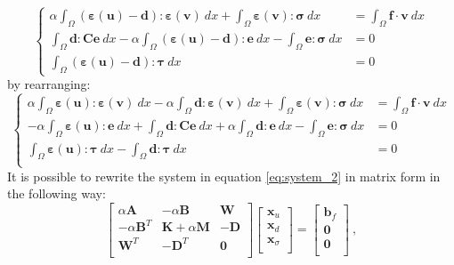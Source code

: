 \documentclass[preprint,12pt,authoryear]{elsarticle}
\begin{document}
\begin{equation} \label{eq:system_1}
\left\lbrace
\begin{split}
\alpha\int_{\Omega}(\bm{\varepsilon}(\bm{u})-\bm{d}):
\bm{\varepsilon}(\bm{v})\:dx +\int_{\Omega}\bm{\varepsilon}(\bm{v}):\bm{\sigma}\:dx &=\int_{\Omega} \bm{f}\cdot\bm{v}\:dx \\
\int_{\Omega}\bm{d}:\bm{C}\bm{e}\:dx-\alpha\int_{\Omega}
(\bm{\varepsilon}(\bm{u})-\bm{d}):\bm{e}\:dx 
-\int_{\Omega}\bm{e}:\bm{\sigma}\:dx &=0 \\
\int_{\Omega}(\bm{\varepsilon}(\bm{u})-\bm{d}):\bm{\tau}\:dx &= 0
\end{split}
\right.
\end{equation}
by rearranging:
\begin{equation} \label{eq:system_2}
\left\lbrace
\begin{array}{lll}
\alpha\int_{\Omega}\bm{\varepsilon}(\bm{u}):\bm{\varepsilon}(\bm{v})\:dx 
-\alpha\int_{\Omega}\bm{d}:\bm{\varepsilon}(\bm{v})\:dx
+\int_{\Omega}\bm{\varepsilon}(\bm{v}):\bm{\sigma}\:dx 
&=\int_{\Omega}\bm{f}\cdot\bm{v}\:dx\\ 
-\alpha\int_{\Omega}\bm{\varepsilon}(\bm{u}):\bm{e}\:dx
+\int_{\Omega}\bm{d}:\bm{C}\bm{e}\:dx
+\alpha\int_{\Omega}\bm{d}:\bm{e}\:dx
-\int_{\Omega}\bm{e}:\bm{\sigma}\:dx&= 0 \\
\int_{\Omega}\bm{\varepsilon}(\bm{u}):\bm{\tau}\:dx
-\int_{\Omega}\bm{d}:\bm{\tau}\:dx &= 0 \\
\end{array}
\right.
\end{equation}
It is possible to rewrite the system in equation \eqref{eq:system_2} in matrix form in the following way: 
\begin{equation}
\left[
\begin{array}{ccc}
\alpha \bm{A} & -\alpha \bm{B} & \bm{W} \\
-\alpha \bm{B}^{T} & \bm{K}+\alpha \bm{M} & -\bm{D} \\
\bm{W}^{T}  & - \bm{D}^{T} & \bm{0} \\ 
\end{array}
\right] 
\left[
\begin{array}{c}
\bm{x}_{u} \\
\bm{x}_{d} \\
\bm{x}_{\sigma} \\
\end{array}
\right] =
\left[
\begin{array}{c}
\bm{b}_{f} \\
\bm{0} \\
\bm{0} \\
\end{array}
\right]\:,
\end{equation}
\end{document}
